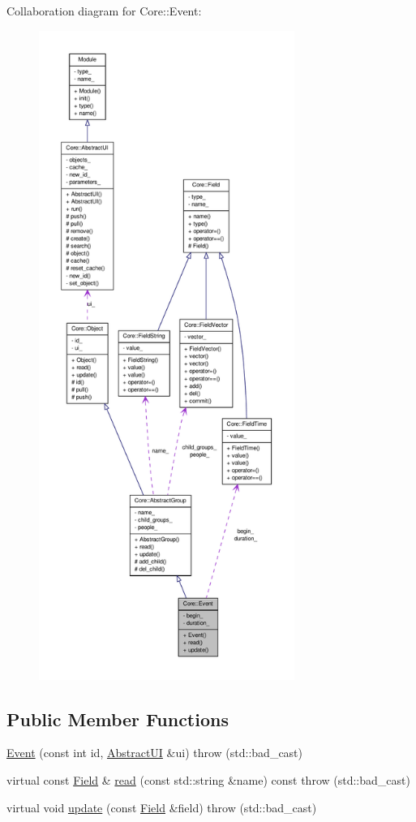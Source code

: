 Collaboration diagram for Core::Event:
\nopagebreak
\begin{figure}[H]
\begin{center}
\leavevmode
\includegraphics[height=600pt]{d2/d72/classCore_1_1Event__coll__graph}
\end{center}
\end{figure}
\subsection*{Public Member Functions}
\begin{DoxyCompactItemize}
\item 
\hyperlink{classCore_1_1Event_ae95aab029470950df22a02c95e6bce5b}{Event} (const int id, \hyperlink{classCore_1_1AbstractUI}{AbstractUI} \&ui)  throw (std::bad\_\-cast)
\item 
virtual const \hyperlink{classCore_1_1Field}{Field} \& \hyperlink{classCore_1_1Event_ac78ff90453b84d3342971772bba5c265}{read} (const std::string \&name) const   throw (std::bad\_\-cast)
\item 
virtual void \hyperlink{classCore_1_1Event_a8e147f35e8ee4fd0891a290424b098d3}{update} (const \hyperlink{classCore_1_1Field}{Field} \&field)  throw (std::bad\_\-cast)
\end{DoxyCompactItemize}


